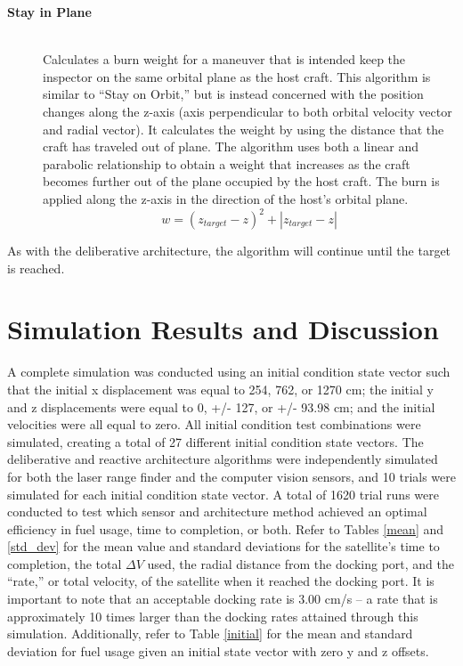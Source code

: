 \documentclass[journal, 10pt]{IEEEtran}
\begin{document}
\begin{description}
\item[\textbf{Stay in Plane}] \hfill \\
Calculates a burn weight for a maneuver that is intended keep the inspector on the same orbital plane as the host craft.  This algorithm is similar to ``Stay on Orbit,'' but is instead concerned with the position changes along the z-axis (axis perpendicular to both orbital velocity vector and radial vector).  It calculates the weight by using the distance that the craft has traveled out of plane.  The algorithm uses both a linear and parabolic relationship to obtain a weight that increases as the craft becomes further out of the plane occupied by the host craft.  The burn is applied along the z-axis in the direction of the host's orbital plane.
\begin{equation}
w = (z_{target}-z)^2+|z_{target}-z|
\end{equation}

\end{description}

As with the deliberative architecture, the algorithm will continue until the target is reached.


\section{Simulation Results and Discussion} \label{discuss}
A complete simulation was conducted using an initial condition state vector such that the initial x displacement was equal to 254, 762, or 1270 cm; the initial y and z displacements were equal to 0, +/- 127, or +/- 93.98 cm; and the initial velocities were all equal to zero. All initial condition test combinations were simulated, creating a total of 27 different initial condition state vectors. The deliberative and reactive architecture algorithms were independently simulated for both the laser range finder and the computer vision sensors, and 10 trials were simulated for each initial condition state vector. A total of 1620 trial runs were conducted to test which sensor and architecture method achieved an optimal efficiency in fuel usage, time to completion, or both. Refer to Tables \ref{mean} and \ref{std_dev} for the mean value and standard deviations for the satellite's time to completion, the total $\Delta V$ used, the radial distance from the docking port, and the ``rate,'' or total velocity, of the satellite when it reached the docking port. It is important to note that an acceptable docking rate is 3.00 cm/s -- a rate that is approximately 10 times larger than the docking rates attained through this simulation. Additionally, refer to Table \ref{initial} for the mean and standard deviation for fuel usage given an initial state vector with zero y and z offsets. 
\end{document}
